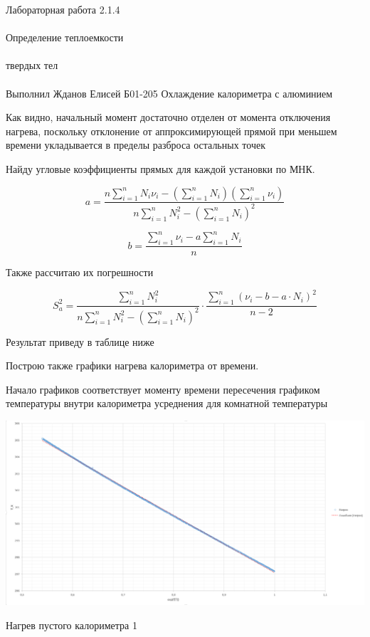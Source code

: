 \documentclass{astroedu-lab}
\begin{document}
\begin{problem}{\huge Лабораторная работа 2.1.4\\\\Определение теплоемкости\\\\твердых тел\\\\Выполнил Жданов Елисей Б01-205}
Охлаждение калориметра с алюминием

Как видно, начальный момент достаточно отделен от момента отключения нагрева, поскольку отклонение от аппроксимирующей прямой при меньшем времени укладывается в пределы разброса остальных точек

Найду угловые коэффициенты прямых для каждой установки по МНК.

\[
	a = \frac{n \sum_{i=1}^n N_i \nu_i - \left( \sum_{i=1}^n N_i \right) \left( \sum_{i=1}^n \nu_i \right)}{n \sum_{i=1}^n N_i^2 - \left( \sum_{i=1}^n N_i \right)^2}
\]

\[
	b = \frac{\sum_{i=1}^n \nu_i - a \sum_{i=1}^n N_i}{n}
\]

Также рассчитаю их погрешности

\begin{equation}
	S_a^2 = \frac{\sum_{i=1}^n N_i^2}{n \sum_{i=1}^n N_i^2 - \left( \sum_{i=1}^n N_i \right)^2} \cdot \frac{\sum_{i=1}^n \left( \nu_i - b - a \cdot N_i \right)^2}{n - 2}
\end{equation}

Результат приведу в таблице ниже

Построю также графики нагрева калориметра от времени.

Начало графиков соответствует моменту времени пересечения графиком температуры внутри калориметра усреднения для комнатной температуры

\begin{center}
\includegraphics[width=1\textwidth]{картинки/2023-02-11_14-58-31.png}
\label{ris:image}
\end{center}

Нагрев пустого калориметра 1


\end{problem}
\end{document}
